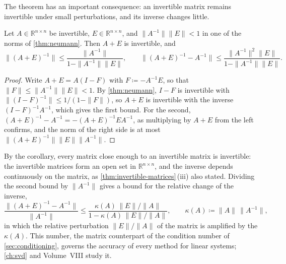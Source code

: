 \begin{figure}
\end{figure}

The theorem has an important consequence: an invertible matrix remains invertible under small perturbations, and its inverse changes little.

\begin{corollary}
\label{cor:perturbed-inverse}
Let $A\in\mathbb R^{n\times n}$ be invertible, $E\in\mathbb R^{n\times n}$, and $\|A^{-1}\|\|E\|<1$ in one of the norms of \cref{thm:neumann}. Then $A+E$ is invertible, and
\[
\bigl\|(A+E)^{-1}\bigr\|\le\frac{\|A^{-1}\|}{1-\|A^{-1}\|\|E\|},\qquad\bigl\|(A+E)^{-1}-A^{-1}\bigr\|\le\frac{\|A^{-1}\|^2\|E\|}{1-\|A^{-1}\|\|E\|}.
\]
\end{corollary}

\begin{proof}
Write $A+E=A(I-F)$ with $F\coloneqq-A^{-1}E$, so that $\|F\|\le\|A^{-1}\|\|E\|<1$. By \cref{thm:neumann}, $I-F$ is invertible with $\|(I-F)^{-1}\|\le1/(1-\|F\|)$, so $A+E$ is invertible with the inverse $(I-F)^{-1}A^{-1}$, which gives the first bound. For the second, $(A+E)^{-1}-A^{-1}=-(A+E)^{-1}EA^{-1}$, as multiplying by $A+E$ from the left confirms, and the norm of the right side is at most $\|(A+E)^{-1}\|\|E\|\|A^{-1}\|$.
\end{proof}

By the corollary, every matrix close enough to an invertible matrix is invertible: the invertible matrices form an open set in $\mathbb R^{n\times n}$, and the inverse depends continuously on the matrix, as \cref{thm:invertible-matrices}\,(iii) also stated. Dividing the second bound by $\|A^{-1}\|$ gives a bound for the relative change of the inverse,
\[
\frac{\|(A+E)^{-1}-A^{-1}\|}{\|A^{-1}\|}\le\frac{\kappa(A)\,\|E\|/\|A\|}{1-\kappa(A)\,\|E\|/\|A\|},\qquad\kappa(A)\coloneqq\|A\|\,\|A^{-1}\|,
\]
in which the relative perturbation $\|E\|/\|A\|$ of the matrix is amplified by the  $\kappa(A)$. This number, the matrix counterpart of the condition number of \cref{sec:conditioning}, governs the accuracy of every method for linear systems; \cref{ch:svd} and Volume~VIII study it.

